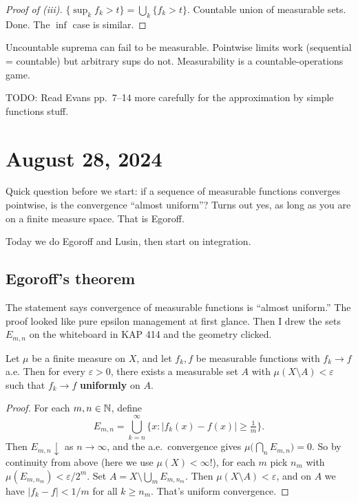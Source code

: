 \begin{proof}[Proof of (iii)]
$\{\sup_k f_k > t\} = \bigcup_k \{f_k > t\}$. Countable union of
measurable sets. Done. The $\inf$ case is similar.
\qedhere
\end{proof}

\begin{remark}\label{rem:uncountable-sup}
Uncountable suprema can fail to be measurable. Pointwise
limits work (sequential = countable) but arbitrary sups do not.
Measurability is a countable-operations game.
\end{remark}

TODO: Read Evans pp.\ 7--14 more carefully for the approximation by simple functions stuff.


\section{August 28, 2024}\label{sec:lec2}

Quick question before we start: if a sequence of measurable functions converges
pointwise, is the convergence ``almost uniform''? Turns out yes, as long
as you are on a finite measure space. That is Egoroff.

Today we do Egoroff and Lusin, then start on integration.

\subsection{Egoroff's theorem}\label{subsec:egoroff}

The statement says convergence of measurable functions is ``almost uniform.'' The
proof looked like pure epsilon management at first glance. Then I drew the sets $E_{m,n}$ on the whiteboard in KAP 414 and the geometry clicked.

\begin{theorem}[Egoroff]\label{thm:egoroff}
Let $\mu$ be a finite measure on $X$, and let $f_k, f$ be measurable
functions with $f_k \to f$ a.e. Then for every $\varepsilon > 0$, there
exists a measurable set $A$ with $\mu(X \setminus A) < \varepsilon$ such
that $f_k \to f$ \textbf{uniformly} on $A$.
\end{theorem}

\begin{proof}
For each $m, n \in \mathbb{N}$, define
\[
  E_{m,n} = \bigcup_{k=n}^{\infty}
    \bigl\{ x : |f_k(x) - f(x)| \ge \tfrac{1}{m} \bigr\}.
\]
Then $E_{m,n} \downarrow$ as $n \to \infty$, and the a.e.\ convergence
gives $\mu\bigl(\bigcap_n E_{m,n}\bigr) = 0$. So by continuity from above
(here we use $\mu(X) < \infty$!), for each $m$ pick $n_m$ with
$\mu(E_{m,n_m}) < \varepsilon / 2^m$. Set
$A = X \setminus \bigcup_m E_{m,n_m}$. Then
$\mu(X \setminus A) < \varepsilon$, and on $A$ we have
$|f_k - f| < 1/m$ for all $k \ge n_m$. That's uniform convergence.
\qedhere
\end{proof}

